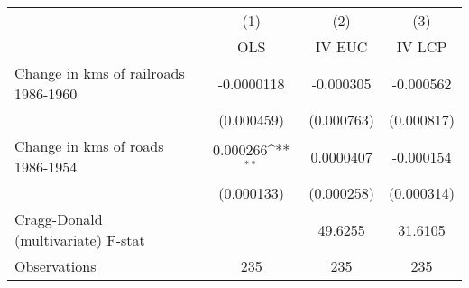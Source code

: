 {
\def\sym#1{\ifmmode^{#1}\else\(^{#1}\)\fi}
\begin{tabular}{l*{3}{c}}
\hline\hline
                &\multicolumn{1}{c}{(1)}&\multicolumn{1}{c}{(2)}&\multicolumn{1}{c}{(3)}\\
                &\multicolumn{1}{c}{OLS}&\multicolumn{1}{c}{IV EUC}&\multicolumn{1}{c}{IV LCP}\\
\hline
Change in kms of railroads 1986-1960&-0.0000118         &-0.000305         &-0.000562         \\
                &(0.000459)         &(0.000763)         &(0.000817)         \\
[1em]
Change in kms of roads 1986-1954& 0.000266\sym{**} &0.0000407         &-0.000154         \\
                &(0.000133)         &(0.000258)         &(0.000314)         \\
\hline
Cragg-Donald (multivariate) F-stat&                  &  49.6255         &  31.6105         \\
Observations    &      235         &      235         &      235         \\
\hline\hline
\end{tabular}
}
